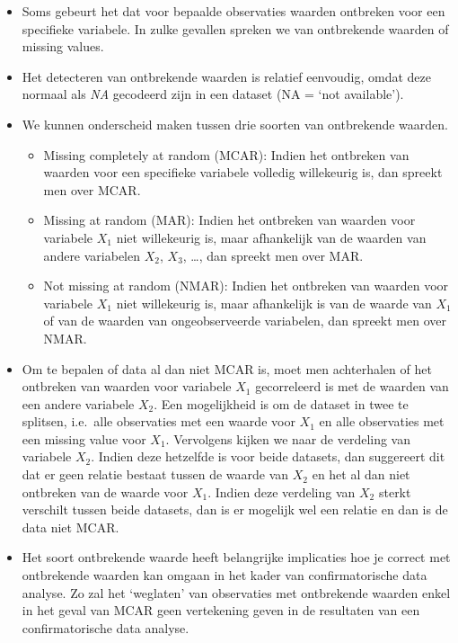 \documentclass[]{memoir}
\providecommand{\tightlist}{%
  \setlength{\itemsep}{0pt}\setlength{\parskip}{0pt}}
\begin{document}
\begin{itemize}
\tightlist
\item
  Soms gebeurt het dat voor bepaalde observaties waarden ontbreken voor een specifieke variabele. In zulke gevallen spreken we van ontbrekende waarden of missing values.
\item
  Het detecteren van ontbrekende waarden is relatief eenvoudig, omdat deze normaal als \emph{NA} gecodeerd zijn in een dataset (NA = `not available').
\item
  We kunnen onderscheid maken tussen drie soorten van ontbrekende waarden.

  \begin{itemize}
  \tightlist
  \item
    Missing completely at random (MCAR): Indien het ontbreken van waarden voor een specifieke variabele volledig willekeurig is, dan spreekt men over MCAR.
  \item
    Missing at random (MAR): Indien het ontbreken van waarden voor variabele \(X_1\) niet willekeurig is, maar afhankelijk van de waarden van andere variabelen \(X_2\), \(X_3\), \ldots{}, dan spreekt men over MAR.
  \item
    Not missing at random (NMAR): Indien het ontbreken van waarden voor variabele \(X_1\) niet willekeurig is, maar afhankelijk is van de waarde van \(X_1\) of van de waarden van ongeobserveerde variabelen, dan spreekt men over NMAR.
  \end{itemize}
\item
  Om te bepalen of data al dan niet MCAR is, moet men achterhalen of het ontbreken van waarden voor variabele \(X_1\) gecorreleerd is met de waarden van een andere variabele \(X_2\). Een mogelijkheid is om de dataset in twee te splitsen, i.e.~alle observaties met een waarde voor \(X_1\) en alle observaties met een missing value voor \(X_1\). Vervolgens kijken we naar de verdeling van variabele \(X_2\). Indien deze hetzelfde is voor beide datasets, dan suggereert dit dat er geen relatie bestaat tussen de waarde van \(X_2\) en het al dan niet ontbreken van de waarde voor \(X_1\). Indien deze verdeling van \(X_2\) sterkt verschilt tussen beide datasets, dan is er mogelijk wel een relatie en dan is de data niet MCAR.\\
\item
  Het soort ontbrekende waarde heeft belangrijke implicaties hoe je correct met ontbrekende waarden kan omgaan in het kader van confirmatorische data analyse. Zo zal het `weglaten' van observaties met ontbrekende waarden enkel in het geval van MCAR geen vertekening geven in de resultaten van een confirmatorische data analyse.

\end{itemize}
\end{document}
